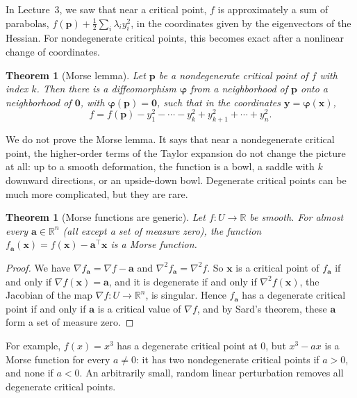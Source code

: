 \documentclass[11pt]{article}
\theoremstyle{definition}
\theoremstyle{plain}
\newtheorem{theorem}[definition]{Theorem}
\theoremstyle{remark}
\begin{document}
In Lecture~3, we saw that near a critical point, $f$ is approximately a sum of parabolas, $f(\mathbf{p}) + \frac{1}{2}\sum_i \lambda_i y_i^2$, in the coordinates given by the eigenvectors of the Hessian. For nondegenerate critical points, this becomes exact after a nonlinear change of coordinates.

\begin{theorem}[Morse lemma]\label{thm:morse-lemma}
    Let $\mathbf{p}$ be a nondegenerate critical point of $f$ with index $k$. Then there is a diffeomorphism $\boldsymbol{\varphi}$ from a neighborhood of $\mathbf{p}$ onto a neighborhood of $\mathbf{0}$, with $\boldsymbol{\varphi}(\mathbf{p}) = \mathbf{0}$, such that in the coordinates $\mathbf{y} = \boldsymbol{\varphi}(\mathbf{x})$,
    \[f = f(\mathbf{p}) - y_1^2 - \cdots - y_k^2 + y_{k+1}^2 + \cdots + y_n^2.\]
\end{theorem}

We do not prove the Morse lemma. It says that near a nondegenerate critical point, the higher-order terms of the Taylor expansion do not change the picture at all: up to a smooth deformation, the function is a bowl, a saddle with $k$ downward directions, or an upside-down bowl. Degenerate critical points can be much more complicated, but they are rare.

\begin{theorem}[Morse functions are generic]\label{thm:morse-generic}
    Let $f: U \to \mathbb{R}$ be smooth. For almost every $\mathbf{a} \in \mathbb{R}^n$ (all except a set of measure zero), the function $f_{\mathbf{a}}(\mathbf{x}) = f(\mathbf{x}) - \mathbf{a}^\top\mathbf{x}$ is a Morse function.
\end{theorem}

\begin{proof}
    We have $\nabla f_{\mathbf{a}} = \nabla f - \mathbf{a}$ and $\nabla^2 f_{\mathbf{a}} = \nabla^2 f$. So $\mathbf{x}$ is a critical point of $f_{\mathbf{a}}$ if and only if $\nabla f(\mathbf{x}) = \mathbf{a}$, and it is degenerate if and only if $\nabla^2 f(\mathbf{x})$, the Jacobian of the map $\nabla f: U \to \mathbb{R}^n$, is singular. Hence $f_{\mathbf{a}}$ has a degenerate critical point if and only if $\mathbf{a}$ is a critical value of $\nabla f$, and by Sard's theorem, these $\mathbf{a}$ form a set of measure zero.
\end{proof}

For example, $f(x) = x^3$ has a degenerate critical point at $0$, but $x^3 - ax$ is a Morse function for every $a \neq 0$: it has two nondegenerate critical points if $a > 0$, and none if $a < 0$. An arbitrarily small, random linear perturbation removes all degenerate critical points.
\end{document}
